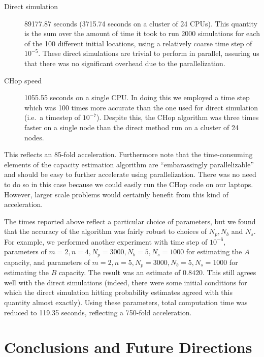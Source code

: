 \documentclass[english, aip, jcp, priprint, graphicx,floatfix]{revtex4-1}
\theoremstyle{plain}
\theoremstyle{definition}
\theoremstyle{plain}
\begin{document}
\begin{description}
\item[Direct simulation] 89177.87 seconds (3715.74 seconds on a cluster of 24 CPUs).  This quantity is the sum over the amount of time it took to run 2000 simulations for each of the 100 different initial locations, using a relatively coarse time step of $10^{-5}$.  These direct simulations are trivial to perform in parallel, assuring us that there was no significant overhead due to the parallelization.

\item[CHop speed] 1055.55 seconds on a single CPU. In doing this we employed a time step which was 100 times more accurate than the one used for direct simulation (i.e.\ a timestep of $10^{-7}$). Despite this, the CHop algorithm was three times faster on a single node than the direct method run on a cluster of 24 nodes.

\end{description}

This reflects an 85-fold acceleration.  Furthermore note that the time-consuming elements of the capacity estimation algorithm are ``embarassingly parallelizable'' and should be easy to further accelerate using parallelization.  There was no need to do so in this case because we could easily run the CHop code on our laptops.  However, larger scale problems would certainly benefit from this kind of acceleration.  

The times reported above reflect a particular choice of parameters, but we found that the accuracy of the algorithm was fairly robust to choices of $N_p, N_b$ and $N_s$.  For example, we performed another experiment with time step of $10^{-6}$, parameters of $ m = 2, n = 4, N_p = 3000, N_b = 5, N_s = 1000 $ for estimating the $A$ capacity, and parameters of $ m = 2, n = 5, N_p = 3000, N_b = 5, N_s = 1000 $ for estimating the $B$ capacity.  The result was an estimate of $0.8420$. This still agrees well with the direct simulations (indeed, there were some initial conditions for which the direct simulation hitting probability estimates agreed with this quantity almost exactly).  Using these parameters, total computation time was reduced to 119.35 seconds, reflecting a 750-fold acceleration.

\section{Conclusions and Future Directions}\label{sec:conclusion}
\end{document}

